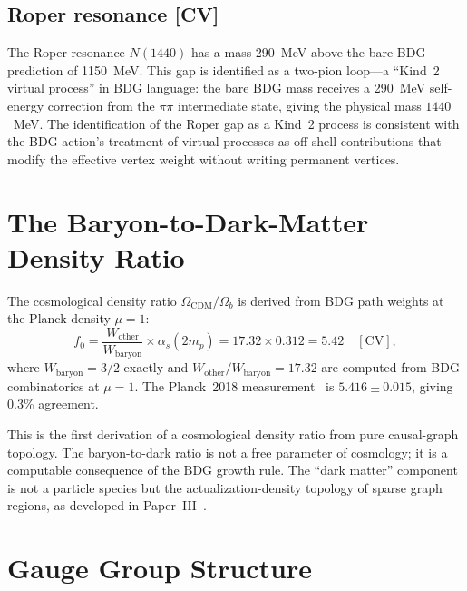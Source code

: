 \documentclass[12pt,a4paper]{article}
\begin{document}
\subsection{Roper resonance [CV]}\label{sec:roper}

The Roper resonance $N(1440)$ has a mass 290~MeV above the bare BDG prediction of 1150~MeV. This gap is identified as a two-pion loop---a ``Kind~2 virtual process'' in BDG language: the bare BDG mass receives a 290~MeV self-energy correction from the $\pi\pi$ intermediate state, giving the physical mass $1440$~MeV. The identification of the Roper gap as a Kind~2 process is consistent with the BDG action's treatment of virtual processes as off-shell contributions that modify the effective vertex weight without writing permanent vertices.

\section{The Baryon-to-Dark-Matter Density Ratio}\label{sec:f0}

The cosmological density ratio $\Omega_{\mathrm{CDM}}/\Omega_b$ is derived from BDG path weights at the Planck density $\mu=1$:
\begin{equation}
f_0 = \frac{W_{\mathrm{other}}}{W_{\mathrm{baryon}}} \times \alpha_s(2m_p) = 17.32 \times 0.312 = 5.42 \quad[\text{CV}],
\label{eq:f0}
\end{equation}
where $W_{\mathrm{baryon}} = 3/2$ exactly and $W_{\mathrm{other}}/W_{\mathrm{baryon}} = 17.32$ are computed from BDG combinatorics at $\mu=1$. The Planck~2018 measurement~\cite{Planck2020} is $5.416 \pm 0.015$, giving 0.3\% agreement.

This is the first derivation of a cosmological density ratio from pure causal-graph topology. The baryon-to-dark ratio is not a free parameter of cosmology; it is a computable consequence of the BDG growth rule. The ``dark matter'' component is not a particle species but the actualization-density topology of sparse graph regions, as developed in Paper~III~\cite{P3}.

\section{Gauge Group Structure}\label{sec:gauge}
\end{document}
